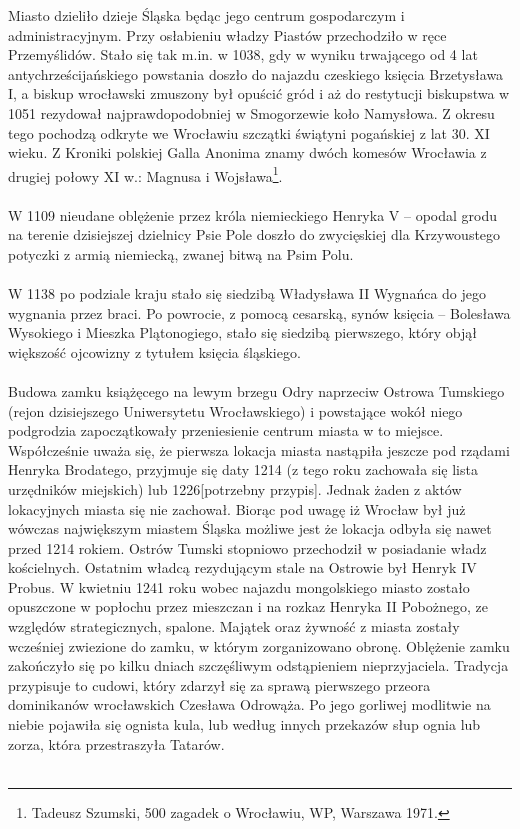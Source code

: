 \documentclass[12pt]{article}
\begin{document}
Miasto dzieliło dzieje Śląska będąc jego centrum gospodarczym i administracyjnym. Przy osłabieniu władzy Piastów przechodziło w ręce Przemyślidów. Stało się tak m.in. w 1038, gdy w wyniku trwającego od 4 lat antychrześcijańskiego powstania doszło do najazdu czeskiego księcia Brzetysława I, a biskup wrocławski zmuszony był opuścić gród i aż do restytucji biskupstwa w 1051 rezydował najprawdopodobniej w Smogorzewie koło Namysłowa. Z okresu tego pochodzą odkryte we Wrocławiu szczątki świątyni pogańskiej z lat 30. XI wieku. Z Kroniki polskiej Galla Anonima znamy dwóch komesów Wrocławia z drugiej połowy XI w.: Magnusa i Wojsława\footnote{Tadeusz Szumski, 500 zagadek o Wrocławiu, WP, Warszawa 1971.}.\\\\
W 1109 nieudane oblężenie przez króla niemieckiego Henryka V – opodal grodu na terenie dzisiejszej dzielnicy Psie Pole doszło do zwycięskiej dla Krzywoustego potyczki z armią niemiecką, zwanej bitwą na Psim Polu.\\\\
W 1138 po podziale kraju stało się siedzibą Władysława II Wygnańca do jego wygnania przez braci. Po powrocie, z pomocą cesarską, synów księcia – Bolesława Wysokiego i Mieszka Plątonogiego, stało się siedzibą pierwszego, który objął większość ojcowizny z tytułem księcia śląskiego.\\\\
Budowa zamku książęcego na lewym brzegu Odry naprzeciw Ostrowa Tumskiego (rejon dzisiejszego Uniwersytetu Wrocławskiego) i powstające wokół niego podgrodzia zapoczątkowały przeniesienie centrum miasta w to miejsce. Współcześnie uważa się, że pierwsza lokacja miasta nastąpiła jeszcze pod rządami Henryka Brodatego, przyjmuje się daty 1214 (z tego roku zachowała się lista urzędników miejskich) lub 1226[potrzebny przypis]. Jednak żaden z aktów lokacyjnych miasta się nie zachował. Biorąc pod uwagę iż Wrocław był już wówczas największym miastem Śląska możliwe jest że lokacja odbyła się nawet przed 1214 rokiem. Ostrów Tumski stopniowo przechodził w posiadanie władz kościelnych. Ostatnim władcą rezydującym stale na Ostrowie był Henryk IV Probus. W kwietniu 1241 roku wobec najazdu mongolskiego miasto zostało opuszczone w popłochu przez mieszczan i na rozkaz Henryka II Pobożnego, ze względów strategicznych, spalone. Majątek oraz żywność z miasta zostały wcześniej zwiezione do zamku, w którym zorganizowano obronę. Oblężenie zamku zakończyło się po kilku dniach szczęśliwym odstąpieniem nieprzyjaciela. Tradycja przypisuje to cudowi, który zdarzył się za sprawą pierwszego przeora dominikanów wrocławskich Czesława Odrowąża. Po jego gorliwej modlitwie na niebie pojawiła się ognista kula, lub według innych przekazów słup ognia lub zorza, która przestraszyła Tatarów.\\\\
\end{document}

